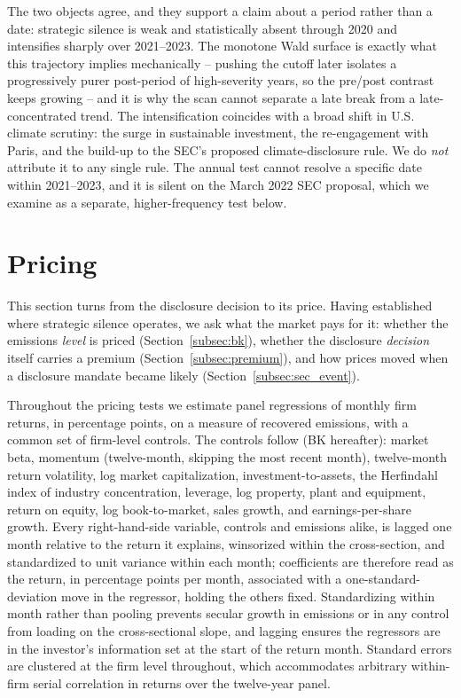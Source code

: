 \documentclass[a4paper,12pt]{article}
\newcommand{\citet}[1]{\textcite{#1}}
\begin{document}
The two objects agree, and they support a claim about a period rather than a date: strategic silence is weak and statistically absent through 2020 and intensifies sharply over 2021--2023. The monotone Wald surface is exactly what this trajectory implies mechanically -- pushing the cutoff later isolates a progressively purer post-period of high-severity years, so the pre/post contrast keeps growing -- and it is why the scan cannot separate a late break from a late-concentrated trend. The intensification coincides with a broad shift in U.S. climate scrutiny: the surge in sustainable investment, the re-engagement with Paris, and the build-up to the SEC's proposed climate-disclosure rule. We do \emph{not} attribute it to any single rule. The annual test cannot resolve a specific date within 2021--2023, and it is silent on the March 2022 SEC proposal, which we examine as a separate, higher-frequency test below.

\section{Pricing}
\label{sec:pricing}\label{subsec:return_spec}

This section turns from the disclosure decision to its price. Having established where strategic silence operates, we ask what the market pays for it: whether the emissions \emph{level} is priced (Section~\ref{subsec:bk}), whether the disclosure \emph{decision} itself carries a premium (Section~\ref{subsec:premium}), and how prices moved when a disclosure mandate became likely (Section~\ref{subsec:sec_event}).

Throughout the pricing tests we estimate panel regressions of monthly firm returns, in percentage points, on a measure of recovered emissions, with a common set of firm-level controls. The controls follow \citet{bolton2021investors} (BK hereafter): market beta, momentum (twelve-month, skipping the most recent month), twelve-month return volatility, log market capitalization, investment-to-assets, the Herfindahl index of industry concentration, leverage, log property, plant and equipment, return on equity, log book-to-market, sales growth, and earnings-per-share growth. Every right-hand-side variable, controls and emissions alike, is lagged one month relative
to the return it explains, winsorized within the cross-section, and standardized to unit variance within each month; coefficients are therefore read as the return, in percentage points per month, associated with a one-standard-deviation move in the
regressor, holding the others fixed. Standardizing within month rather than pooling prevents secular growth in emissions or in any control from loading on the cross-sectional slope, and lagging ensures the regressors are in the investor's information set at the start of the return month. Standard errors are clustered at the firm level throughout, which accommodates arbitrary within-firm serial correlation in returns over the twelve-year panel.
\end{document}
